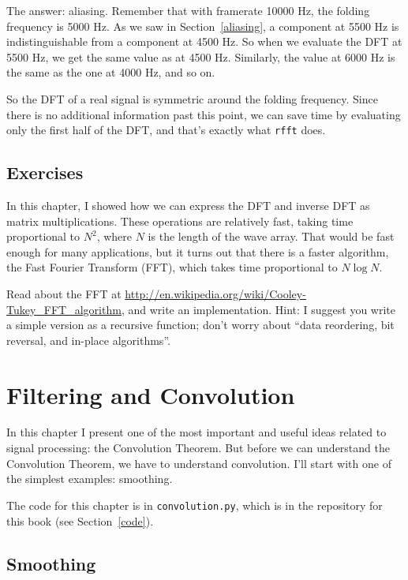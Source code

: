 \documentclass[12pt]{book}
\begin{document}
The answer: aliasing.  Remember that with framerate 10000 Hz, the
folding frequency is 5000 Hz.  As we saw in Section~\ref{aliasing},
a component at 5500 Hz is indistinguishable from a component
at 4500 Hz.  So when we evaluate the DFT at 5500 Hz, we get the same
value as at 4500 Hz.  Similarly, the value at 6000 Hz is the same
as the one at 4000 Hz, and so on.

So the DFT of a real signal is symmetric around the folding frequency.
Since there is no additional information past this point, we can
save time by evaluating only the first half of the DFT,
and that's exactly what {\tt rfft} does.


\section{Exercises}

\begin{exercise}
In this chapter, I showed how we can express the DFT and inverse
DFT as matrix multiplications.  These operations are relatively
fast, taking time proportional to $N^2$, where $N$ is the length
of the wave array.  That would be fast enough for many applications,
but it turns out that there is a faster algorithm, the
Fast Fourier Transform (FFT), which takes time proportional to 
$N \log N$.

Read about the FFT at
\url{http://en.wikipedia.org/wiki/Cooley-Tukey_FFT_algorithm}, and
write an implementation.  Hint: I suggest you write a simple version
as a recursive function; don't worry about ``data reordering, bit
reversal, and in-place algorithms''.
\end{exercise}


\chapter{Filtering and Convolution}

In this chapter I present one of the most important and useful
ideas related to signal processing: the Convolution Theorem.
But before we can understand the Convolution Theorem, we have to understand
convolution.  I'll start with one of the simplest examples: smoothing.

The code for this chapter is in {\tt convolution.py}, which is in the
repository for this book (see Section~\ref{code}).


\section{Smoothing}
\label{smoothing}
\end{document}
